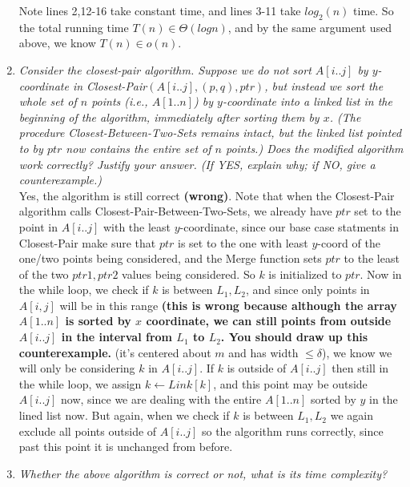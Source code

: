 \documentclass[10pt,oneside,reqno]{amsart}
\theoremstyle{plain}
\theoremstyle{definition}
\theoremstyle{remark}
\begin{document}
\begin{enumerate}[label=\arabic*.]
\vspace{3mm}
Note lines 2,12-16 take constant time, and lines 3-11 take $log_2(n)$ time. So the total running time $T(n) \in\Theta(logn)$, and by the same argument used above, we know $T(n) \in o(n)$. \\

\item \textit{Consider the closest-pair algorithm. Suppose we do not sort $A[i..j]$ by $y$-coordinate in Closest-Pair$(A[i..j],(p,q),ptr)$,  but  instead  we  sort  the  whole  set of $n$ points  (i.e., $A[1..n]$) by $y$-coordinate  into  a  linked  list  in  the  beginning  of  the  algorithm,  immediately  after  sorting
them  by $x$. (The  procedure  Closest-Between-Two-Sets  remains  intact,  but  the  linked  list pointed to by $ptr$ now contains the entire set of $n$ points.)  Does the modified algorithm work
correctly?  Justify your answer.  (If YES, explain why; if NO, give a counterexample.)}\\

Yes, the algorithm is still correct \textbf{(wrong)}. Note that when the Closest-Pair algorithm calls Closest-Pair-Between-Two-Sets, we already have $ptr$ set to the point in $A[i..j]$ with the least $y$-coordinate, since our base case statments in Closest-Pair make sure that $ptr$ is set to the one with least $y$-coord of the one/two points being considered, and the Merge function sets $ptr$ to the least of the two $ptr1,ptr2$ values being considered. So $k$ is initialized to $ptr$. Now in the while loop, we check if $k$ is between $L_1,L_2$, and since only points in $A[i,j]$ will be in this range \textbf{(this is wrong because although the array $A[1..n]$ is sorted by $x$ coordinate, we can still points from outside $A[i..j]$ in the interval from $L_1$ to $L_2$. You should draw up this counterexample.} (it's centered about $m$ and has width $\leq \delta$), we know we will only be considering $k$ in $A[i..j]$. If $k$ is outside of $A[i..j]$ then still in the while loop, we assign $k \longleftarrow Link[k]$, and this point may be outside $A[i..j]$ now, since we are dealing with the entire $A[1..n]$ sorted by $y$ in the lined list now. But again, when we check if $k$ is between $L_1,L_2$ we again exclude all points outside of $A[i..j]$ so the algorithm runs correctly, since past this point it is unchanged from before. \\

\item \textit{Whether the above algorithm is correct or not, what is its time complexity?}


\end{enumerate}
\end{document}
